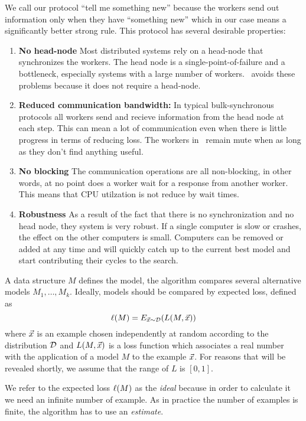 We call our protocol ``tell me something new'' because the workers
send out information only when they have ``something new'' which in
our case means a significantly better strong rule. This protocol has
several desirable properties:
\begin{enumerate}
\item {\bf No head-node} Most distributed systems rely on a head-node
  that synchronizes the workers. The head node is a
  single-point-of-failure and a bottleneck, especially systems with a
  large number of workers. \tmsn\ avoids these problems because it
  does not require a head-node.
\item {\bf Reduced communication bandwidth:} In typical bulk-synchronous
  protocols all workers send and recieve information from the head
  node at each step. This can mean a lot of communication even when
  there is little progress in terms of reducing loss. The workers in
  \tmsn\ remain mute when as long as they don't find anything useful.
\item {\bf No blocking} The communication operations are all
  non-blocking, in other words, at no point does a worker wait for a
  response from another worker. This means that CPU utilzation is not
  reduce by wait times.
\item {\bf Robustness} As a result of the fact that there is no
  synchronization and no head node, they system is very robust. If a
  single computer is slow or crashes, the effect on the other
  computers is small. Computers can be removed or added at any time
  and will quickly catch up to the current best model and start
  contributing their cycles to the search.
\end{enumerate}

\iffalse
A data structure $M$ defines the model, the
algorithm compares several alternative models $M_1,\ldots,M_k$. Ideally,
models should be compared by expected loss, defined as 
$$\ell(M) = E_{\vec{x} \sim {\cal D}}(L(M,\vec{x}))$$
where $\vec{x}$ is an example chosen independently at random according to
the distribution ${\cal D}$ and $L(M,\vec{x})$ is a loss function which associates a
real number with the application of a model $M$ to the example $\vec{x}$.
For reasons that will be revealed shortly, we assume that the range of
$L$ is $[0,1]$.

We refer to the expected loss $\ell(M)$ as the {\em ideal} because in
order to calculate it we need an infinite number of example. As in
practice the number of examples is finite, the algorithm has to use an {\em estimate}.

